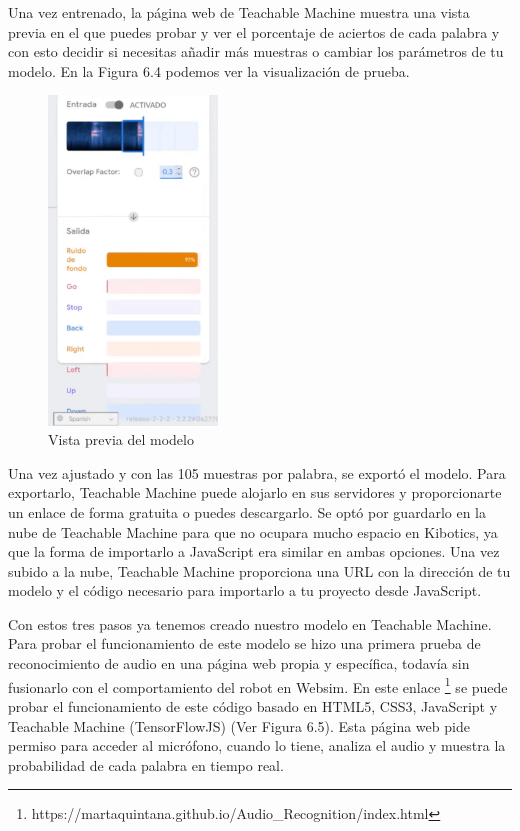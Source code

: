 \begin{itemize}
Una vez entrenado, la página web de Teachable Machine muestra una vista previa en el que puedes probar y ver el porcentaje de aciertos de cada palabra y con esto decidir si necesitas añadir más muestras o cambiar los parámetros de tu modelo.  En la Figura 6.4 podemos ver la visualización de prueba.

\begin{figure}[H]
 \centering
    \includegraphics[width=0.4\textwidth, height=0.6\textwidth]{chapters/images/teachablemachine2.png}
    \caption{Vista previa del modelo}
\end{figure}
 

Una vez ajustado y con las 105 muestras por palabra, se exportó el modelo. 
Para exportarlo, Teachable Machine puede alojarlo en sus servidores y proporcionarte  un enlace de forma gratuita o puedes descargarlo. Se optó por guardarlo en la nube de Teachable Machine para que no ocupara mucho espacio en Kibotics, ya que la forma de importarlo  a JavaScript era similar en ambas opciones.
Una vez subido a la nube, Teachable Machine proporciona una URL con la dirección de tu modelo y el código necesario para importarlo a tu proyecto desde JavaScript.
\end{itemize}

Con estos tres pasos ya tenemos creado nuestro modelo en Teachable Machine. Para probar el funcionamiento de este modelo se hizo una  primera prueba de reconocimiento de audio en una página web propia y específica, todavía sin fusionarlo con el comportamiento del robot en Websim. En este enlace \footnote{https://martaquintana.github.io/Audio\_Recognition/index.html} se puede probar el funcionamiento de este código basado en HTML5, CSS3, JavaScript y Teachable Machine (TensorFlowJS) (Ver Figura 6.5). Esta página web pide permiso para acceder al micrófono, cuando lo tiene, analiza el audio  y muestra la probabilidad de cada palabra en tiempo real.  

